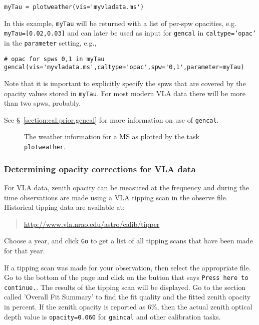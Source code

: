 \small
\begin{verbatim}
myTau = plotweather(vis='myvladata.ms')
\end{verbatim}
\normalsize

In this example, {\tt myTau} will be returned with a list of per-spw
opacities, e.g. {\tt myTau=[0.02,0.03]} and can later be used as input for 
{\tt gencal} in {\tt caltype='opac'} in the {\tt parameter} setting, 
e.g.,

\small
\begin{verbatim}
# opac for spws 0,1 in myTau
gencal(vis='myvladata.ms',caltype='opac',spw='0,1',parameter=myTau)  
\end{verbatim}
\normalsize

Note that it is important to explicitly specify the spws that are
covered by the opacity values stored in {\tt myTau}.  For most modern
VLA data there will be more than two spws, probably.

See \S~\ref{section:cal.prior.gencal} for more information on use
of {\tt gencal}.

\begin{figure}[h!]
\begin{center}
\caption{\label{fig:plotweather}
The weather information for a MS as plotted by the task {\tt plotweather}.}
\hrulefill
\end{center}
\end{figure}




\subsubsection{Determining opacity corrections for VLA data}
\label{section:cal.prior.opacity.vla}

For VLA data, zenith opacity can be measured at the frequency
and during the time observations are made using a VLA tipping scan in
the observe file.  Historical tipping data are available at:
\begin{quote}
   \url{http://www.vla.nrao.edu/astro/calib/tipper}
\end{quote}
Choose a year, and click {\tt Go} to get a list of all tipping scans
that have been made for that year.

If a tipping scan was made for your observation, then select the
appropriate file.  Go to the bottom of the page and click on the
button that says {\tt Press here to continue.}.  The results of the
tipping scan will be displayed.  Go to the section called 'Overall Fit
Summary' to find the fit quality and the fitted zenith opacity in
percent.  If the zenith opacity is reported as 6\%, then the actual
zenith optical depth value is {\tt opacity=0.060} for {\tt gaincal}
and other calibration tasks.

